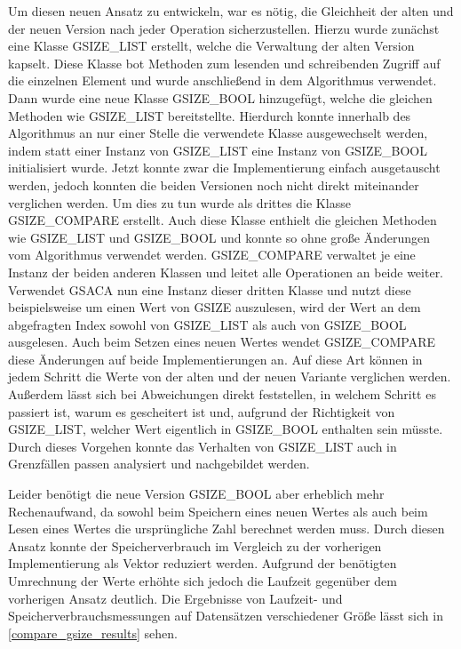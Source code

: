 Um diesen neuen Ansatz zu entwickeln, war es nötig, die Gleichheit der alten und der neuen Version nach jeder Operation sicherzustellen.
Hierzu wurde zunächst eine Klasse GSIZE\_LIST erstellt, welche die Verwaltung der alten Version kapselt.
Diese Klasse bot Methoden zum lesenden und schreibenden Zugriff auf die einzelnen Element und wurde anschließend in dem Algorithmus verwendet.
Dann wurde eine neue Klasse GSIZE\_BOOL hinzugefügt, welche die glei\-chen Methoden wie GSIZE\_LIST bereitstellte.
Hierdurch konnte innerhalb des Algorithmus an nur einer Stelle die verwendete Klasse ausgewechselt werden, indem statt einer Instanz von GSIZE\_LIST eine Instanz von GSIZE\_BOOL initialisiert wurde.
Jetzt konnte zwar die Implementierung einfach ausgetauscht werden, jedoch konnten die beiden Versionen noch nicht direkt miteinander verglichen werden.
Um dies zu tun wurde als drittes die Klasse GSIZE\_COMPARE erstellt.
Auch diese Klasse enthielt die gleichen Methoden wie GSIZE\_LIST und GSIZE\_BOOL und konnte so ohne große Änderungen vom Algorithmus verwendet werden.
GSIZE\_COMPARE verwaltet je eine Instanz der beiden anderen Klassen und leitet alle Operationen an beide weiter.
Verwendet GSACA nun eine Instanz dieser dritten Klasse und nutzt diese beispielsweise um einen Wert von GSIZE auszulesen, wird der Wert an dem abgefragten Index sowohl von GSIZE\_LIST als auch von GSIZE\_BOOL ausgelesen.
Auch beim Setzen eines neuen Wertes wendet GSIZE\_COMPARE diese Änderungen auf beide Implementierungen an.
Auf diese Art können in jedem Schritt die Werte von der alten und der neuen Variante verglichen werden.
Außerdem lässt sich bei Abweichungen direkt feststellen, in welchem Schritt es passiert ist, warum es gescheitert ist und, aufgrund der Richtigkeit von GSIZE\_LIST, welcher Wert eigentlich in GSIZE\_BOOL enthalten sein müsste.
Durch dieses Vorgehen konnte das Verhalten von GSIZE\_LIST auch in Grenzfällen passen analysiert und nachgebildet werden. \par
Leider benötigt die neue Version GSIZE\_BOOL aber erheblich mehr Re\-chen\-auf\-wand, da sowohl beim Speichern eines neuen Wertes als auch beim Lesen eines Wertes die ursprüngliche Zahl berechnet werden muss.
Durch diesen Ansatz konnte der Speicherverbrauch im Vergleich zu der vorherigen Implementierung als Vektor reduziert werden.
Aufgrund der benötigten Umrechnung der Werte erhöhte sich jedoch die Laufzeit gegenüber dem vorherigen Ansatz deutlich.
Die Ergebnisse von Laufzeit- und Speicherverbrauchsmessungen auf Datensätzen verschiedener Größe lässt sich in \ref{compare_gsize_results} sehen.
